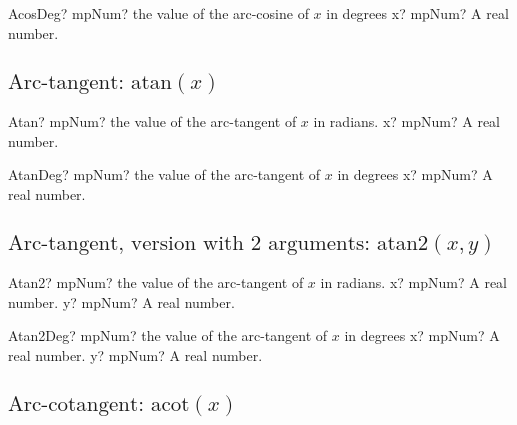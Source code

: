 \vspace{0.6cm}

\begin{mpFunctionsExtract}
	\mpFunctionOne
	{AcosDeg? mpNum? the value of the arc-cosine of $x$ in degrees}
	{x? mpNum? A real number.}
\end{mpFunctionsExtract}






\subsection{\texorpdfstring{$\text{Arc-tangent: atan}(x)$}{atan}}

\begin{mpFunctionsExtract}
	\mpFunctionOne
	{Atan? mpNum? the value of the arc-tangent of $x$ in radians.}
	{x? mpNum? A real number.}
\end{mpFunctionsExtract}

\vspace{0.6cm}

\begin{mpFunctionsExtract}
	\mpFunctionOne
	{AtanDeg? mpNum? the value of the arc-tangent of $x$ in degrees}
	{x? mpNum? A real number.}
\end{mpFunctionsExtract}





\subsection{\texorpdfstring{$\text{Arc-tangent, version with 2 arguments: atan2}(x,y)$}{atan2}}

\begin{mpFunctionsExtract}
	\mpFunctionTwo
	{Atan2? mpNum? the value of the arc-tangent of $x$ in radians.}
	{x? mpNum? A real number.}
	{y? mpNum? A real number.}
\end{mpFunctionsExtract}

\vspace{0.6cm}

\begin{mpFunctionsExtract}
	\mpFunctionTwo
	{Atan2Deg? mpNum? the value of the arc-tangent of $x$ in degrees}
	{x? mpNum? A real number.}
	{y? mpNum? A real number.}
\end{mpFunctionsExtract}






\subsection{\texorpdfstring{$\text{Arc-cotangent: acot}(x)$}{acot}}


